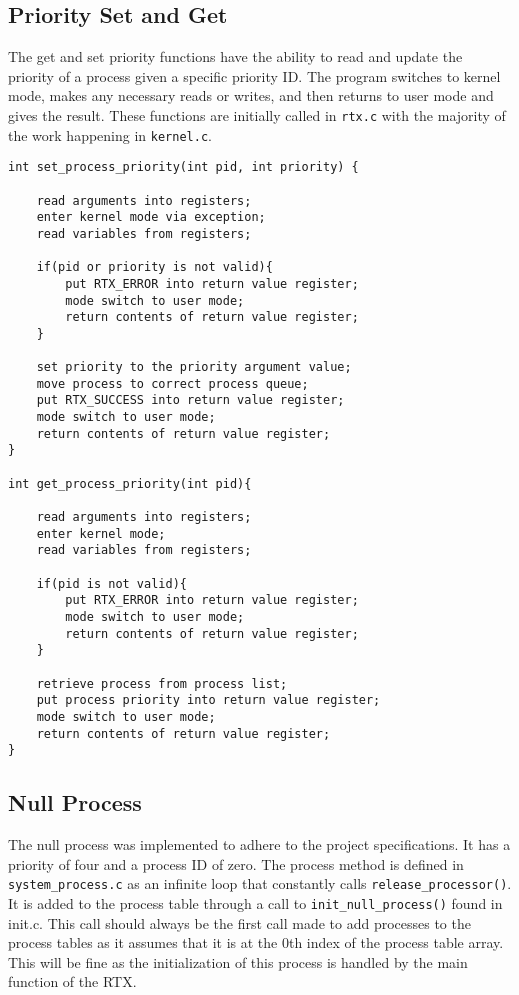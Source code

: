 \documentclass[oneside]{article}
\begin{document}
\subsection*{Priority Set and Get}
The get and set priority functions have the ability to read and update the priority of a process given a specific priority ID. The program switches to kernel mode, makes any necessary reads or writes, and then returns to user mode and gives the result. These functions are initially called in \texttt{rtx.c} with the majority of the work happening in \texttt{kernel.c}.
\begin{lstlisting}
int set_process_priority(int pid, int priority) {
    
    read arguments into registers;
    enter kernel mode via exception;
    read variables from registers;

    if(pid or priority is not valid){
        put RTX_ERROR into return value register;
        mode switch to user mode;
        return contents of return value register;
    }

    set priority to the priority argument value;
    move process to correct process queue;
    put RTX_SUCCESS into return value register;
    mode switch to user mode;
    return contents of return value register;
}
    
int get_process_priority(int pid){
    
    read arguments into registers;
    enter kernel mode;
    read variables from registers;
    
    if(pid is not valid){
        put RTX_ERROR into return value register;
        mode switch to user mode;
        return contents of return value register;
    }

    retrieve process from process list;
    put process priority into return value register;
    mode switch to user mode;
    return contents of return value register;
}
\end{lstlisting}

\subsection*{Null Process}
The null process was implemented to adhere to the project specifications. It
has a priority of four and a process ID of zero. The process method is defined in
\texttt{system\_process.c} as an infinite loop that constantly calls
\texttt{release\_processor()}. It is added to the process table through a call to
\texttt{init\_null\_process()} found in init.c. This call should always be the first
call made to add processes to the process tables as it assumes that it is at
the 0th index of the process table array. This will be fine as the
initialization of this process is handled by the main function of the RTX.
\end{document}
